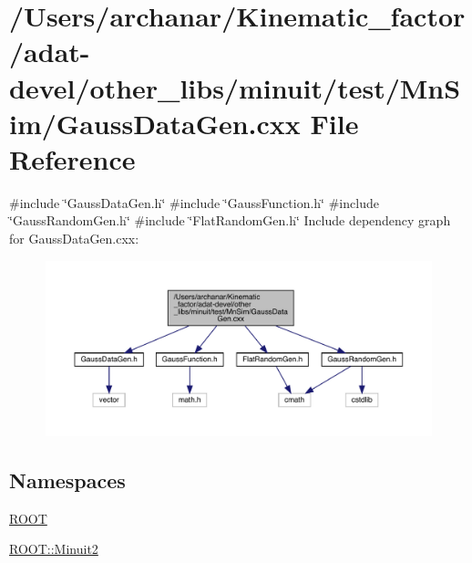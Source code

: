 \hypertarget{adat-devel_2other__libs_2minuit_2test_2MnSim_2GaussDataGen_8cxx}{}\section{/\+Users/archanar/\+Kinematic\+\_\+factor/adat-\/devel/other\+\_\+libs/minuit/test/\+Mn\+Sim/\+Gauss\+Data\+Gen.cxx File Reference}
\label{adat-devel_2other__libs_2minuit_2test_2MnSim_2GaussDataGen_8cxx}
{\ttfamily \#include \char`\"{}Gauss\+Data\+Gen.\+h\char`\"{}}\newline
{\ttfamily \#include \char`\"{}Gauss\+Function.\+h\char`\"{}}\newline
{\ttfamily \#include \char`\"{}Gauss\+Random\+Gen.\+h\char`\"{}}\newline
{\ttfamily \#include \char`\"{}Flat\+Random\+Gen.\+h\char`\"{}}\newline
Include dependency graph for Gauss\+Data\+Gen.\+cxx\+:
\nopagebreak
\begin{figure}[H]
\begin{center}
\leavevmode
\includegraphics[width=350pt]{d4/d3d/adat-devel_2other__libs_2minuit_2test_2MnSim_2GaussDataGen_8cxx__incl}
\end{center}
\end{figure}
\subsection*{Namespaces}
\begin{DoxyCompactItemize}
\item 
 \mbox{\hyperlink{namespaceROOT}{R\+O\+OT}}
\item 
 \mbox{\hyperlink{namespaceROOT_1_1Minuit2}{R\+O\+O\+T\+::\+Minuit2}}
\end{DoxyCompactItemize}
